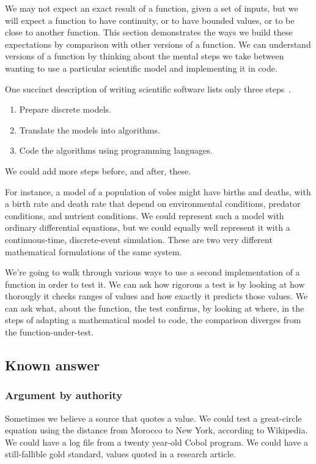 \documentclass[fleqn,10pt]{olplainarticle}
\begin{document}
We may not expect an exact result of a function, given
a set of inputs, but we will expect a function to have continuity,
or to have bounded values, or to be close to another function.
This section demonstrates the ways we build these expectations
by comparison with other versions of a function. We can understand
versions of a function by thinking about the mental steps
we take between wanting to use a particular scientific model
and implementing it in code.

One succinct description of writing scientific software 
lists only three steps~\citep{dahlgren2005}.
\begin{enumerate}
  \item Prepare discrete models.
  \item Translate the models into algorithms.
  \item Code the algorithms using programming languages.
\end{enumerate}
We could add more steps before, and after, these.

For instance, a model of a population of voles might have
births and deaths, with a birth rate and death rate that
depend on environmental conditions, predator conditions,
and nutrient conditions. We could represent such a model
with ordinary differential equations, but we could equally
well represent it with a continuous-time, discrete-event
simulation. These are two very different mathematical
formulations of the same system.

We're going to walk through various ways to use a second
implementation of a function in order to test it.
We can ask how rigorous a test is by looking at how
thorougly it checks ranges of values and how exactly
it predicts those values. We can ask what, about the function,
the test confirms, by looking at where, in the steps
of adapting a mathematical model to code, the comparison
diverges from the function-under-test.


\subsection{Known answer}
\subsubsection{Argument by authority}
Sometimes we believe a source that quotes a value. We could
test a great-circle equation using the distance from Morocco
to New York, according to Wikipedia. We could have a log
file from a twenty year-old Cobol program. We could have
a still-fallible gold standard, values quoted in a research article.
\end{document}
